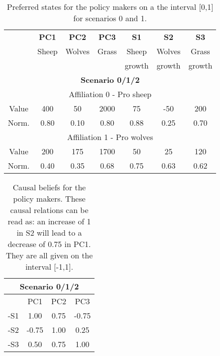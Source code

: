 \documentclass[12pt]{article}
\begin{document}

\begin{table}[h!]
\begin{center}
\begin{tabular}{ |c|c|c|c|c|c|c| } 
\hline

			& {\bfseries PC1}
					&  {\bfseries PC2}
							&  {\bfseries PC3}
									&  {\bfseries S1}	
											&  {\bfseries S2}	
													&  {\bfseries S3}  	\\ 
			& Sheep	& Wolves	& Grass	& Sheep	& Wolves	& Grass 	\\
			&		&		&		& growth	& growth	& growth	\\ \hline \hline \hline
\multicolumn{7}{|c|}{ {\bfseries Scenario 0/1/2}}							\\ \hline \hline	
\multicolumn{7}{|c|}{Affiliation 0 - Pro sheep}							\\ \hline 
Value		& 400	& 50		& 2000	& 75		& -50	& 200	\\ \hline
Norm.		& 0.80	& 0.10	& 0.80	& 0.88	& 0.25	& 0.70	\\ \hline
\multicolumn{7}{|c|}{Affiliation 1 - Pro wolves}							\\ \hline 
Value		& 200	& 175	& 1700	& 50		& 25		& 120	\\ \hline
Norm.		& 0.40	& 0.35	& 0.68	& 0.75	& 0.63	& 0.62	\\ \hline
			
\end{tabular}
\end{center}
\caption{Preferred states for the policy makers on a the interval [0,1] for scenarios 0 and 1.}
\label{tab:preferredStates}
\end{table}

\begin{table}[h!]
\begin{center}
\begin{tabular}{ |c|c|c|c|}
\hline
\multicolumn{4}{|c|}{ {\bfseries Scenario 0/1/2}}	
								\\ \hline \hline
	& PC1	& PC2	& PC3		\\ \hline
-S1 	& 1.00	& 0.75	&-0.75		\\ \hline
-S2 	&-0.75	& 1.00	& 0.25 		\\ \hline
-S3 	& 0.50	& 0.75	& 1.00		\\ 
\hline
\end{tabular}
\end{center}
\caption{Causal beliefs for the policy makers. These causal relations can be read as: an increase of 1 in S2 will lead to a decrease of 0.75 in PC1. They are all given on the interval [-1,1].}
\label{tab:causalBeliefs}
\end{table}
\end{document}
